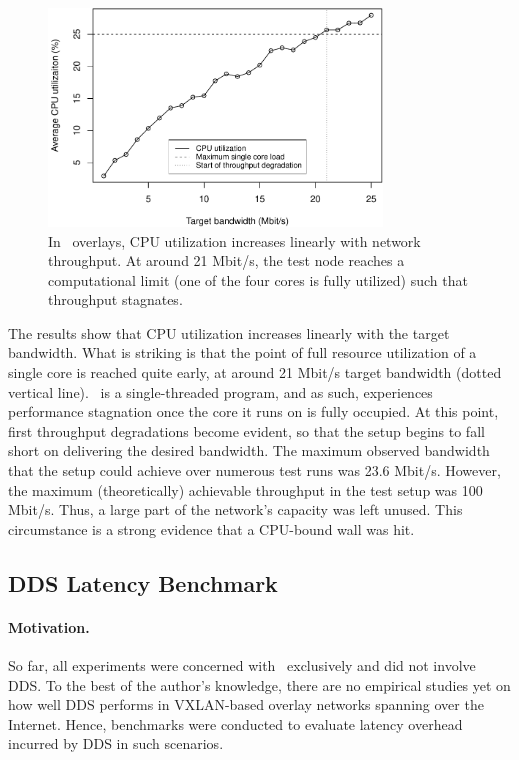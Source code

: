 \begin{figure}[htpb]
  \centering
  \includegraphics[width=0.79\textwidth]{figures/cpu}
  \caption[\weave\ CPU utilization test results]{In \weave\ overlays, CPU utilization increases linearly with network throughput. At around 21 Mbit/s, the test node reaches a computational limit (one of the four cores is fully utilized) such that throughput stagnates.}\label{fig:cpu}
\end{figure}

The results show that CPU utilization increases linearly with the target bandwidth. What is striking is that the point of full resource utilization of a single core is reached quite early, at around 21 Mbit/s target bandwidth (dotted vertical line). \wnet\ is a single-threaded program, and as such, experiences performance stagnation once the core it runs on is fully occupied. At this point, first throughput degradations become evident, so that the setup begins to fall short on delivering the desired bandwidth. The maximum observed bandwidth that the setup could achieve over numerous test runs was 23.6 Mbit/s.
However, the maximum (theoretically) achievable throughput in the test setup was 100 Mbit/s. Thus, a large part of the network's capacity was left unused. This circumstance is a strong evidence that a CPU-bound wall was hit.
%
%
%
%
%
%
%
%
%
%

\subsection{DDS Latency Benchmark} \label{sec:ddslatency}

\paragraph{Motivation.} So far, all experiments were concerned with \wnet\ exclusively and did not involve DDS. To the best of the author's knowledge, there are no empirical studies yet on how well DDS performs in VXLAN-based overlay networks spanning over the Internet. Hence, benchmarks were conducted to evaluate latency overhead incurred by DDS in such scenarios.

